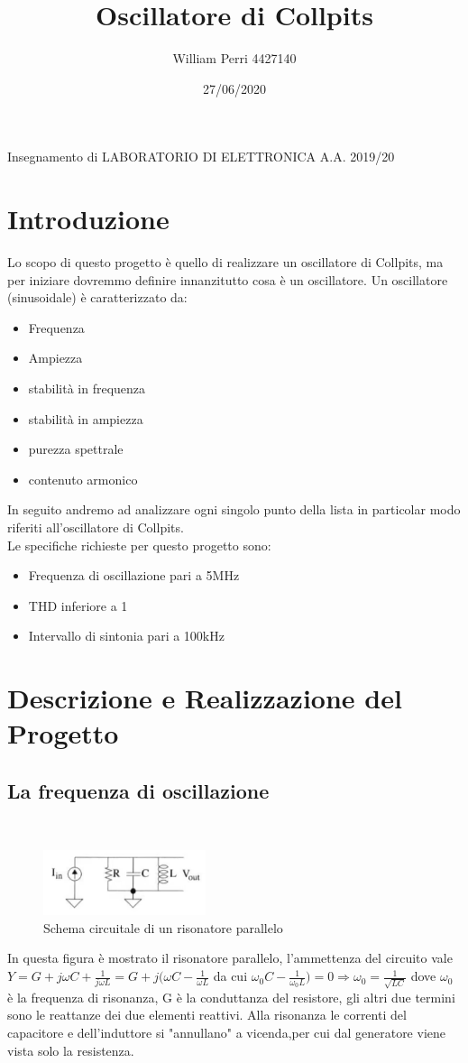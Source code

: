 \documentclass{article}
\title{Oscillatore di Collpits}
\author{William Perri 4427140 }
\date{27/06/2020}
\newcommand\tab[1][1cm]{\hspace*{#1}}
\begin{document}
\maketitle
\tab \tab \tab Insegnamento di LABORATORIO DI ELETTRONICA A.A. 2019/20

\newpage
\tableofcontents
\newpage
\section{Introduzione}
Lo scopo di questo progetto è quello di realizzare un oscillatore di Collpits, ma per iniziare dovremmo definire innanzitutto cosa è un oscillatore.
Un oscillatore (sinusoidale) è caratterizzato da:
\begin{itemize}
\item Frequenza
\item Ampiezza
\item stabilità in frequenza
\item stabilità in ampiezza
\item purezza spettrale
\item contenuto armonico
\end{itemize}
In seguito andremo ad analizzare ogni singolo punto della lista in particolar modo riferiti all'oscillatore di Collpits.\\
Le specifiche richieste per questo progetto sono:
\begin{itemize}
\item Frequenza di oscillazione pari a 5MHz
\item THD inferiore a 1%
\item Intervallo di sintonia pari a 100kHz
\end{itemize}
\newpage
\section{Descrizione e Realizzazione del Progetto}
\subsection{La frequenza di oscillazione}
~\begin{figure}[H]
\includegraphics[scale=2]{RisonatoreParallelo.png} 
\centering
\caption{Schema circuitale di un risonatore parallelo}
\label{fig:foo}
\end{figure}
In questa figura è mostrato il risonatore parallelo, l'ammettenza del circuito vale 
\Large $Y=G+j\omega C+\frac{1}{j\omega L}=G+j(\omega C-\frac{1}{\omega L}$ \normalsize da cui \Large $\omega_0C-\frac{1}{\omega _0L})=0 \Rightarrow \omega _0=\frac{1}{\sqrt{LC}}$ \normalsize dove $\omega _0$ è la frequenza di risonanza, G è la conduttanza del resistore, gli altri due termini sono le reattanze dei due elementi reattivi.
Alla risonanza le correnti del capacitore e dell'induttore si "annullano" a vicenda,per cui dal generatore viene vista solo la resistenza. 
\end{document}

